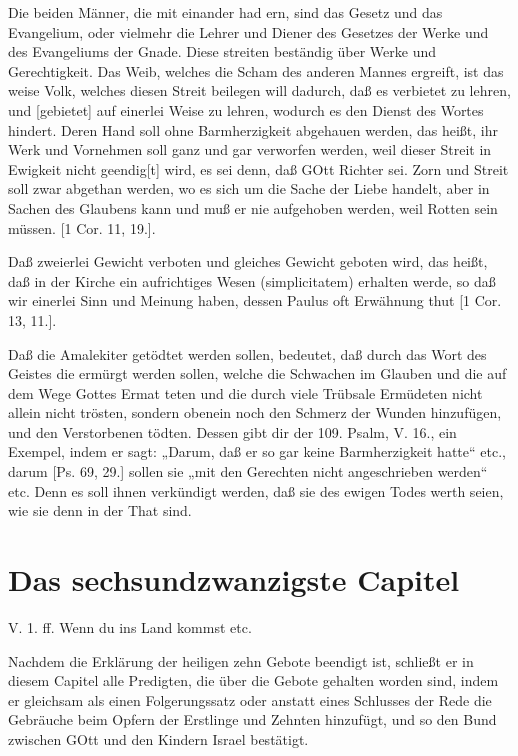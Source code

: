 Die beiden Männer, die mit einander had ern, sind das Gesetz und das Evangelium, oder vielmehr die Lehrer und Diener des Gesetzes der Werke und des Evangeliums der Gnade. Diese streiten beständig über Werke und Gerechtigkeit. Das Weib, welches die Scham des anderen Mannes ergreift, ist das weise Volk, welches diesen Streit beilegen will dadurch, daß es verbietet zu lehren, und [gebietet] auf einerlei Weise zu lehren, wodurch es den Dienst des Wortes hindert. Deren Hand soll ohne Barmherzigkeit abgehauen werden, das heißt, ihr Werk und Vornehmen soll ganz und gar verworfen werden, weil dieser Streit in Ewigkeit nicht geendig[t] wird, es sei denn, daß GOtt Richter sei. Zorn und Streit soll zwar abgethan werden, wo es sich um die Sache der Liebe handelt, aber in Sachen des Glaubens kann und muß er nie aufgehoben werden, weil Rotten sein müssen. [1 Cor. 11, 19.].

Daß zweierlei Gewicht verboten und gleiches Gewicht geboten wird, das heißt, daß in der Kirche ein aufrichtiges Wesen (simplicitatem) erhalten werde, so daß wir einerlei Sinn und Meinung haben, dessen Paulus oft Erwähnung thut [1 Cor. 13, 11.].

Daß die Amalekiter getödtet werden sollen, bedeutet, daß durch das Wort des Geistes die ermürgt werden sollen, welche die Schwachen im Glauben und die auf dem Wege Gottes Ermat teten und die durch viele Trübsale Ermüdeten nicht allein nicht trösten, sondern obenein noch den Schmerz der Wunden hinzufügen, und den Verstorbenen tödten. Dessen gibt dir der 109. Psalm, V. 16., ein Exempel, indem er sagt: „Darum, daß er so gar keine Barmherzigkeit hatte“ etc., darum [Ps. 69, 29.] sollen sie „mit den Gerechten nicht angeschrieben werden“ etc. Denn es soll ihnen verkündigt werden, daß sie des ewigen Todes werth seien, wie sie denn in der That sind.

\section{Das sechsundzwanzigste Capitel}

\begin{schriftzitat}
V. 1. ff. Wenn du ins Land kommst etc.
\end{schriftzitat}

Nachdem die Erklärung der heiligen zehn Gebote beendigt ist, schließt er in diesem Capitel alle Predigten, die über die Gebote gehalten worden sind, indem er gleichsam als einen Folgerungssatz oder anstatt eines Schlusses der Rede die Gebräuche beim Opfern der Erstlinge und Zehnten hinzufügt, und so den Bund zwischen GOtt und den Kindern Israel bestätigt.

